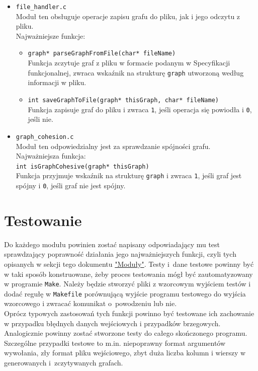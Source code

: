 \documentclass{article}
\begin{document}
\begin{itemize}
    \item \texttt{file\_handler.c} \\
    Moduł ten obsługuje operacje zapisu grafu do pliku, jak i jego odczytu z pliku. \\ 
    Najważniejsze funkcje:
    \begin{itemize}
        \item \texttt{graph* parseGraphFromFile(char* fileName)} \\
        Funkcja zczytuje graf z pliku w formacie podanym w Specyfikacji funkcjonalnej, zwraca wskaźnik na strukturę \texttt{graph} utworzoną według informacji w pliku.
        \item \texttt{int saveGraphToFile(graph* thisGraph, char* fileName)} \\
        Funkcja zapisuje graf do pliku i zwraca \texttt{1}, jeśli operacja się powiodła i \texttt{0}, jeśli nie.
    \end{itemize}
    \item \texttt{graph\_cohesion.c} \\
    Moduł ten odpowiedzialny jest za sprawdzanie spójności grafu. \\
    Najważniejsza funkcja: \\
    \texttt{int isGraphCohesive(graph* thisGraph)} \\
    Funkcja przyjmuje wskaźnik na strukturę \texttt{graph} i zwraca \texttt{1}, jeśli graf jest spójny i \texttt{0}, jeśli graf nie jest spójny.
\end{itemize}

\section{Testowanie}
Do każdego modułu powinien zostać napisany odpowiadający mu test sprawdzający poprawność działania jego najważniejszych funkcji, czyli tych opisanych w sekcji tego dokumentu \hyperref[sec:moduly]{"Moduły"}. Testy i~dane testowe powinny być w taki sposób konstruowane, żeby proces testowania mógł być zautomatyzowany w programie \texttt{Make}. Należy będzie stworzyć pliki z wzorcowym wyjściem testów i dodać regułę w \texttt{Makefile} porównującą wyjście programu testowego do wyjścia wzorcowego i zwracać komunikat o~powodzeniu lub nie.\\ 
Oprócz typowych zastosowań tych funkcji powinno być testowane ich zachowanie w przypadku błędnych danych wejściowych i przypadków brzegowych.
Analogicznie powinny zostać stworzone testy do całego skończonego programu. Szczególne przypadki testowe to m.in. niepoprawny format argumentów wywołania, zły format pliku wejściowego, zbyt duża liczba kolumn i wierszy w generowanych i~zczytywanych grafach.
\end{document}
